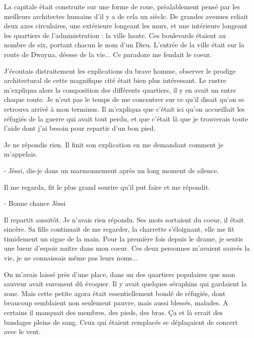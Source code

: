 \documentclass{book}
\begin{document}
La capitale était construite sur une forme de roue, préalablement pensé par les meilleurs architectes humains d'il y a de cela un siècle. De grandes avenues reliait deux axes circulaires, une extérieure longeant les murs, et une intérieure longeant les quartiers de l'administration : la ville haute. Ces boulevards étaient au nombre de six, portant chacun le nom d'un Dieu. L'entrée de la ville était sur la route de Dwayna, déesse de la vie... Ce paradoxe me fendait le coeur.\newline

J'écoutais distraitement les explications du brave homme, observer le prodige architectural de cette magnifique cité était bien plus intéressant. Le rustre m'expliqua alors la composition des différents quartiers, il y en avait un entre chaque route. Je n'eut pas le temps de me concentrer sur ce qu'il disait qu'on se retrouva arrivé à mon terminus. Il m'expliqua que c'était ici qu'on accueillait les réfugiés de la guerre qui avait tout perdu, et que c'était là que je trouverais toute l'aide dont j'ai besoin pour repartir d'un bon pied.\newline

Je ne répondis rien. Il finit son explication en me demandant comment je m'appelais.

- Jèssi, dis-je dans un marmonnement après un long moment de silence.

Il me regarda, fit le plus grand sourire qu'il put faire et me répondit.

- Bonne chance Jèssi\newline

Il repartit aussitôt. Je n'avais rien répondu. Ses mots sortaient du coeur, il était sincère. Sa fille continuait de me regarder, la charrette s'éloignant, elle me fit timidement un signe de la main. Pour la première fois depuis le drame, je sentis une lueur d'espoir naitre dans mon coeur. Ces deux personnes m'avaient sauvés la vie, je ne connaissais même pas leurs noms...\newline

On m'avais laissé près d'une place, dans un des quartiers populaires que mon sauveur avait surement dû évoquer. Il y avait quelques séraphins qui gardaient la zone. Mais cette petite agora était essentiellement bondé de réfugiés, dont beaucoup semblaient non seulement pauvre, mais aussi blessés, malades. A certains il manquait des membres, des pieds, des bras. Ça et là errait des bandages pleins de sang. Ceux qui étaient remplacés se déplaçaient de concert avec le vent.\newline
\end{document}
